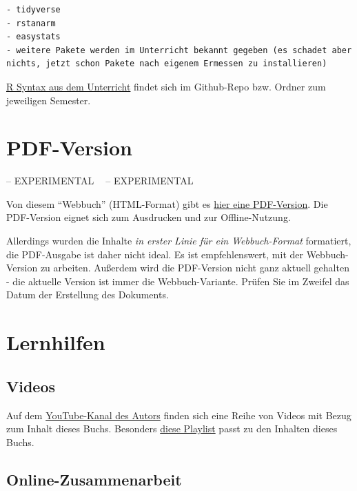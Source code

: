 \documentclass[
  a4paper,
  DIV=11]{scrreprt}
\theoremstyle{definition}
\theoremstyle{remark}
\begin{document}
\begin{verbatim}
- tidyverse
- rstanarm
- easystats
- weitere Pakete werden im Unterricht bekannt gegeben (es schadet aber nichts, jetzt schon Pakete nach eigenem Ermessen zu installieren)
\end{verbatim}

\href{https://github.com/sebastiansauer/Lehre}{R Syntax aus dem
Unterricht} findet sich im Github-Repo bzw. Ordner zum jeweiligen
Semester.

\hypertarget{pdf-version}{%
\section*{PDF-Version}\label{pdf-version}}

-- EXPERIMENTAL 🔬🧪 -- EXPERIMENTAL

Von diesem ``Webbuch'' (HTML-Format) gibt es
\href{Start-Bayes!.pdf}{hier eine PDF-Version}. Die PDF-Version eignet
sich zum Ausdrucken und zur Offline-Nutzung.

Allerdings wurden die Inhalte \emph{in erster Linie für ein
Webbuch-Format} formatiert, die PDF-Ausgabe ist daher nicht ideal. Es
ist empfehlenswert, mit der Webbuch-Version zu arbeiten. Außerdem wird
die PDF-Version nicht ganz aktuell gehalten - die aktuelle Version ist
immer die Webbuch-Variante. Prüfen Sie im Zweifel das Datum der
Erstellung des Dokuments.

\hypertarget{lernhilfen}{%
\section*{Lernhilfen}\label{lernhilfen}}

\hypertarget{videos}{%
\subsection*{Videos}\label{videos}}

Auf dem
\href{https://www.youtube.com/channel/UCkvdtj8maE7g-SOCh4aDB9g}{YouTube-Kanal
des Autors} finden sich eine Reihe von Videos mit Bezug zum Inhalt
dieses Buchs. Besonders
\href{https://www.youtube.com/playlist?list=PLRR4REmBgpIGVptiSN-qDVEJKfFnUqDyL}{diese
Playlist} passt zu den Inhalten dieses Buchs.

\hypertarget{online-zusammenarbeit}{%
\subsection*{Online-Zusammenarbeit}\label{online-zusammenarbeit}}
\end{document}
